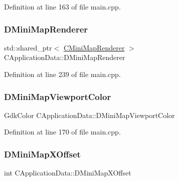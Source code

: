 Definition at line 163 of file main.\+cpp.

\hypertarget{classCApplicationData_a59b0f5dfe30ed5a54dd28aee98109e34}{}\label{classCApplicationData_a59b0f5dfe30ed5a54dd28aee98109e34} 
\subsubsection{\texorpdfstring{D\+Mini\+Map\+Renderer}{DMiniMapRenderer}}
{\footnotesize\ttfamily std\+::shared\+\_\+ptr$<$ \hyperlink{classCMiniMapRenderer}{C\+Mini\+Map\+Renderer} $>$ C\+Application\+Data\+::\+D\+Mini\+Map\+Renderer\hspace{0.3cm}{\ttfamily [protected]}}



Definition at line 239 of file main.\+cpp.

\hypertarget{classCApplicationData_a9a19207b43eece4000159fb1f1d831c3}{}\label{classCApplicationData_a9a19207b43eece4000159fb1f1d831c3} 
\subsubsection{\texorpdfstring{D\+Mini\+Map\+Viewport\+Color}{DMiniMapViewportColor}}
{\footnotesize\ttfamily Gdk\+Color C\+Application\+Data\+::\+D\+Mini\+Map\+Viewport\+Color\hspace{0.3cm}{\ttfamily [protected]}}



Definition at line 170 of file main.\+cpp.

\hypertarget{classCApplicationData_ae651b9d3963288c5c1f5aaf53bf9401d}{}\label{classCApplicationData_ae651b9d3963288c5c1f5aaf53bf9401d} 
\subsubsection{\texorpdfstring{D\+Mini\+Map\+X\+Offset}{DMiniMapXOffset}}
{\footnotesize\ttfamily int C\+Application\+Data\+::\+D\+Mini\+Map\+X\+Offset\hspace{0.3cm}{\ttfamily [protected]}}



